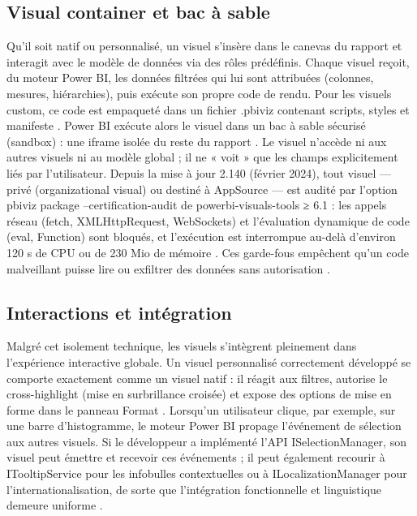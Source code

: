 \subsection{Visual container et bac à sable}
\label{subsec:sandbox}

Qu’il soit natif ou personnalisé, un visuel s’insère dans le canevas du rapport et interagit avec le modèle de données via des rôles prédéfinis.  
Chaque visuel reçoit, du moteur Power BI, les données filtrées qui lui sont attribuées (colonnes, mesures, hiérarchies), puis exécute son propre code de rendu.  
Pour les visuels custom, ce code est empaqueté dans un fichier .pbiviz contenant scripts, styles et manifeste \parencite{MicrosoftPbivizDocs2023}.  
Power BI exécute alors le visuel dans un bac à sable sécurisé (sandbox) : une iframe isolée du reste du rapport \parencite{OkVizSandbox2022}.  
Le visuel n’accède ni aux autres visuels ni au modèle global ; il ne « voit » que les champs explicitement liés par l’utilisateur.  
Depuis la mise à jour 2.140 (février 2024), tout visuel — privé (organizational visual) ou destiné à AppSource — est audité par l’option pbiviz package --certification-audit de powerbi-visuals-tools ≥ 6.1 : les appels réseau (fetch, XMLHttpRequest, WebSockets) et l’évaluation dynamique de code (eval, Function) sont bloqués, et l’exécution est interrompue au-delà d’environ 120 s de CPU ou de 230 Mio de mémoire \parencite{MicrosoftCertificationGuide2025}.  
Ces garde-fous empêchent qu’un code malveillant puisse lire ou exfiltrer des données sans autorisation \parencite{MediumSecurityPBI2023}.

\subsection{Interactions et intégration}
\label{subsec:interactions}

Malgré cet isolement technique, les visuels s’intègrent pleinement dans l’expérience interactive globale.  
Un visuel personnalisé correctement développé se comporte exactement comme un visuel natif : il réagit aux filtres, autorise le cross-highlight (mise en surbrillance croisée) et expose des options de mise en forme dans le panneau Format \parencite{MicrosoftCustomVisGuide2024}.  
Lorsqu’un utilisateur clique, par exemple, sur une barre d’histogramme, le moteur Power BI propage l’événement de sélection aux autres visuels.  
Si le développeur a implémenté l’API ISelectionManager, son visuel peut émettre et recevoir ces événements ; il peut également recourir à ITooltipService pour les infobulles contextuelles ou à ILocalizationManager pour l’internationalisation, de sorte que l’intégration fonctionnelle et linguistique demeure uniforme \parencite{MicrosoftSelectionAPI2024, MicrosoftTooltipAPI2024}.  

